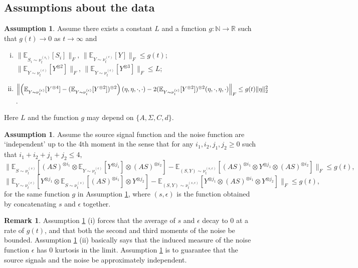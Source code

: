 \documentclass{article} %
\newcommand{\real}{\mathbb{R}}
\renewcommand{\natural}{\mathbb{N}}
\newcommand{\E}{\mathbb{E}}
\theoremstyle{definition}
\newtheorem{remark}[lemma]{Remark}
\newtheorem{assumption}[lemma]{Assumption}
\begin{document}
\subsection{Assumptions about the data}
\label{subsec:assumptions}
\begin{assumption}
\label{ass:gauss}
Assume there exists a constant $L$ and a function $g:\natural\rightarrow \real$ such that $g(t) \to 0$ as $t \to \infty$ and
\begin{enumerate}[(i)]
\item $\| \E_{S_i\sim \nu_t^{(s_i)}} [S_i] \|_F,\, \| \E_{Y \sim \nu_t^{(\epsilon)}} [Y] \|_F \le g(t)$; $\| \E_{Y\sim \nu_t^{(\epsilon)}} [Y^{\otimes 2}] \|_F,\, \| \E_{Y\sim \nu_t^{(\epsilon)}} [Y^{\otimes 3}] \|_F \le L$;
\item $\Bigl\| \left(\E_{Y\sim \nu_t^{(\epsilon)}} [Y^{\otimes4}] - (\E_{Y\sim \nu_t^{(\epsilon)}} [Y^{\otimes2}])^{\otimes 2}\right)(\eta,\eta,\cdot,\cdot)  - 2 (\E_{Y\sim \nu_t^{(\epsilon)}} [Y^{\otimes2}])^{\otimes 2}(\eta,\cdot,\eta,\cdot)\Bigr\|_F\le g(t)\|\eta\|_2^2$.
\end{enumerate}
Here $L$ and the function $g$ may depend on $\{A,\Sigma,C,d\}$.
\end{assumption}
\begin{assumption}
\label{ass:independence}
Assume the source signal function and the noise function are `independent' up to the 4th moment in the sense that for any $i_1,i_2,j_1,j_2 \ge 0$ such that $i_1+i_2+j_1+j_2 \le 4$,  
\[
 \| \E_{S\sim \nu_t^{(s)}} [(AS)^{\otimes i_1}\!\otimes \E_{Y\sim \nu_t^{(\epsilon)}} [Y^{\otimes j_1}] \!\otimes (AS)^{\otimes i_2}]
- \E_{(S, Y)\sim \nu_t^{(s, \epsilon)}} [(AS)^{\otimes i_1}\!\otimes Y^{\otimes j_1}\!\otimes (AS)^{\otimes i_2}]  \|_F 
 \le g(t),
\]
\[
\| \E_{Y\sim \nu_t^{(\epsilon)}} [Y^{\otimes j_1} \otimes \E_{S\sim \nu_t^{(s)}} [(AS)^{\otimes i_1}] \otimes Y^{\otimes j_2}]- \E_{(S, Y)\sim \nu_t^{(s, \epsilon)}} [ Y^{\otimes j_1}\otimes (AS)^{\otimes i_1}\otimes Y^{\otimes j_2}] \|_F 
\le g(t), %
\]
for the same function $g$ in Assumption \ref{ass:gauss}, where $(s,\epsilon)$ is the function obtained by concatenating $s$ and $\epsilon$ together.  
\end{assumption}
\begin{remark}
Assumption \ref{ass:gauss} (i) forces that the average of $s$ and $\epsilon$ decay to 0 at a rate of $g(t)$,
and that both the second and third moments of the noise be bounded.
Assumption \ref{ass:gauss} (ii) basically says that the induced measure of the noise function $\epsilon$ has 0 kurtosis in the limit.
Assumption \ref{ass:independence} is to guarantee that the source signals and the noise be approximately independent.
\end{remark}
\fi
\end{document}
